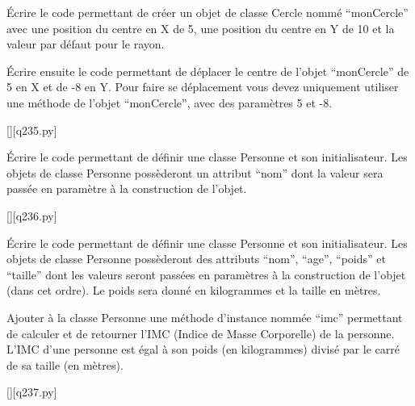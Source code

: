         \question
        Écrire le code permettant de créer un objet de classe Cercle nommé “monCercle” avec une position du centre en X de 5, une position du centre en Y de 10 et la valeur par défaut pour le rayon.

Écrire ensuite le code permettant de déplacer le centre de l’objet “monCercle” de 5 en X et de -8 en Y. Pour faire se déplacement vous devez uniquement utiliser une méthode de l’objet “monCercle”, avec des paramètres 5 et -8.
        \par
        \renewcommand{\nomfichier}{q235.py}
        \begin{solution}
            \pythonfile{\chemincode \nomfichier}[][\nomfichier]
        \end{solution}
        

        \question
        Écrire le code permettant de définir une classe Personne et son initialisateur. Les objets de classe Personne possèderont un attribut “nom” dont la valeur sera passée en paramètre à la construction de l’objet.
        \par
        \renewcommand{\nomfichier}{q236.py}
        \begin{solution}
            \pythonfile{\chemincode \nomfichier}[][\nomfichier]
        \end{solution}
        

        \question
        Écrire le code permettant de définir une classe Personne et son initialisateur. Les objets de classe Personne possèderont des attributs “nom”, “age”, “poids” et “taille” dont les valeurs seront passées en paramètres à la construction de l’objet (dans cet ordre). Le poids sera donné en kilogrammes et la taille en mètres.

Ajouter à la classe Personne une méthode d’instance nommée “imc” permettant de calculer et de retourner l’IMC (Indice de Masse Corporelle) de la personne. L’IMC d’une personne est égal à son poids (en kilogrammes) divisé par le carré de sa taille (en mètres).
        \par
        \renewcommand{\nomfichier}{q237.py}
        \begin{solution}
            \pythonfile{\chemincode \nomfichier}[][\nomfichier]
        \end{solution}
        
